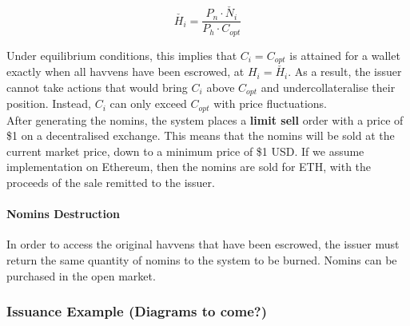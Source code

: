 $$ \check{H_i} = \frac{P_n \cdot \check{N_i}}{P_h \cdot C_{opt}}$$

\noindent Under equilibrium conditions, this implies that $C_i = C_{opt}$ is attained for a wallet exactly when all havvens have been escrowed, at $H_i = \check{H_i}$. As a result, the issuer cannot take actions that would bring $C_i$ above $C_{opt}$ and undercollateralise their position. Instead, $C_i$ can only exceed $C_{opt}$ with price fluctuations. \\

\noindent After generating the nomins, the system places a \textbf{limit sell} order with a price of \$1 on a decentralised exchange. This means that the nomins will be sold at the current market price, down to a minimum price of \$1 USD. If we assume implementation on Ethereum, then the nomins are sold for ETH, with the proceeds of the sale remitted to the issuer.

\paragraph{Nomins Destruction}

\noindent In order to access the original havvens that have been escrowed, the issuer must return the same quantity of nomins to the system to be burned. Nomins can be purchased in the open market.

\subsubsection{Issuance Example (Diagrams to come?)}

